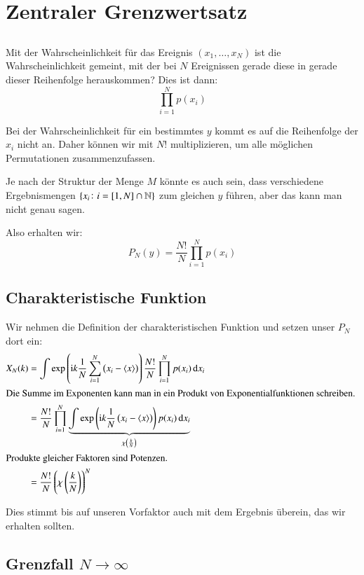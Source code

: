 \section{Zentraler Grenzwertsatz}

\subsection{}

Mit der Wahrscheinlichkeit für das Ereignis $(x_1, \ldots, x_N)$ ist die
Wahrscheinlichkeit gemeint, mit der bei $N$ Ereignissen gerade diese in
gerade dieser Reihenfolge herauskommen? Dies ist dann:
\[
    \prod_{i=1}^N p(x_i)
\]

Bei der Wahrscheinlichkeit für ein bestimmtes $y$ kommt es auf die Reihenfolge
der $x_i$ nicht an. Daher können wir mit $N!$ multiplizieren, um alle möglichen
Permutationen zusammenzufassen.

Je nach der Struktur der Menge $M$ könnte es auch sein, dass verschiedene
Ergebnismengen $\set{x_i \colon i = [1, N] \cap \mathbb N}$ zum gleichen $y$
führen, aber das kann man nicht genau sagen.

Also erhalten wir:
\[
    P_N(y) = \frac{N!}{N} \prod_{i=1}^N p(x_i)
\]

\subsection{Charakteristische Funktion}

Wir nehmen die Definition der charakteristischen Funktion und setzen unser
$P_N$ dort ein:
\begin{align*}
    X_N(k)
    &= \int \exp{\ii k \frac 1N \sum_{i=1}^N \del{x_i - \mw{x}}}
    \frac{N!}N \prod_{i=1}^N p(x_i) \dif x_i \\
    \intertext{%
        Die Summe im Exponenten kann man in ein Produkt von
        Exponentialfunktionen schreiben.
    }
    &= \frac{N!}N \prod_{i=1}^N \underbrace{\int
        \exp{\ii k \frac 1N \del{x_i - \mw{x}}}
    p(x_i) \dif x_i}_{\chi\del{\frac kN}} \\
    \intertext{%
        Produkte gleicher Faktoren sind Potenzen.
    }
    &= \frac{N!}N \del{\chi\del{\frac kN}}^N
\end{align*}

Dies stimmt bis auf unseren Vorfaktor auch mit dem Ergebnis überein, das wir
erhalten sollten.

\subsection{Grenzfall $N\to\infty$}

